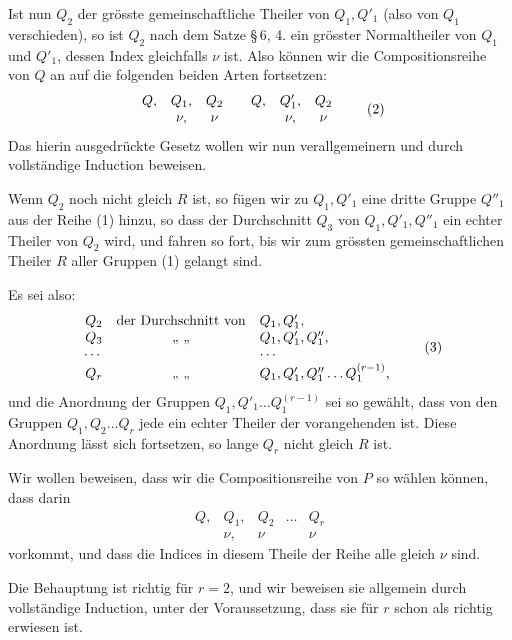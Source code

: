 \documentclass[11pt]{article}
\begin{document}
Ist nun $Q_2$ der grösste gemeinschaftliche Theiler von $Q_1,Q'_1$ (also von $Q_1$ verschieden), so ist $Q_2$ nach dem Satze \S\,6, 4. ein grösster Normaltheiler von $Q_1$ und $Q'_1$, dessen Index gleichfalls $\nu$ ist. Also können wir die Compositionsreihe von $Q$ an auf die folgenden beiden Arten fortsetzen:
\begin{equation}
\begin{array}{ccc@{\qquad}ccc}
Q,&Q_1,&Q_2&Q,&Q'_1,&Q_2\\
&\nu,&\nu&&\nu,&\nu
\end{array}
\tag{2}
\end{equation}
Das hierin ausgedrückte Gesetz wollen wir nun verallgemeinern und durch vollständige Induction beweisen.

Wenn $Q_2$ noch nicht gleich $R$ ist, so fügen wir zu $Q_1,Q'_1$ eine dritte Gruppe $Q''_1$ aus der Reihe (1) hinzu, so dass der Durchschnitt $Q_3$ von $Q_1,Q'_1,Q''_1$ ein echter Theiler von $Q_2$ wird, und fahren so fort, bis wir zum grössten gemeinschaftlichen Theiler $R$ aller Gruppen (1) gelangt sind.

Es sei also:
\begin{equation}
\begin{array}{rcl}
Q_2&\hbox{der Durchschnitt von}&Q_1,Q'_1,\\
Q_3&\hbox{ ,, ,, }&Q_1,Q'_1,Q''_1,\\
\cdots&&\cdots\\
Q_r&\hbox{ ,, ,, }&Q_1,Q'_1,Q''_1\ldots Q_1^{(r-1)},
\end{array}
\tag{3}
\end{equation}
und die Anordnung der Gruppen $Q_1,Q'_1\ldots Q_1^{(r-1)}$ sei so gewählt, dass von den Gruppen $Q_1,Q_2\ldots Q_r$ jede ein echter Theiler der vorangehenden ist. Diese Anordnung lässt sich fortsetzen, so lange $Q_r$ nicht gleich $R$ ist.

Wir wollen beweisen, dass wir die Compositionsreihe von $P$ so wählen können, dass darin
\begin{equation}
\begin{array}{ccccc}
Q,&Q_1,&Q_2&\ldots&Q_r\\
&\nu,&\nu&&\nu
\end{array}
\tag{4}
\end{equation}
vorkommt, und dass die Indices in diesem Theile der Reihe alle gleich $\nu$ sind.

Die Behauptung ist richtig für $r=2$, und wir beweisen sie allgemein durch vollständige Induction, unter der Voraussetzung, dass sie für $r$ schon als richtig erwiesen ist.
\end{document}
